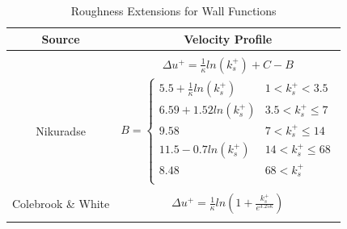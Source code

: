 \begin{table}[htb!]
\centering
\caption{Roughness Extensions for Wall Functions}
\label{tab:roughnessExtensionss}
\begin{tabular}{cc}
\hline
Source &
Velocity Profile \\ \hline\hline
& \\ 
& $\Delta u^+ = \frac{1}{\kappa}ln(k_s^+) + C - B $ \\
Nikuradse  \cite{nikuradse1933laws} & 
$B =
    \begin{cases}
      5.5 + \frac{1}{\kappa} ln(k_s^+) & 1<k_s^+ <3.5\\
      6.59 + 1.52ln(k_s^+) & 3.5<k_s^+ \leq 7\\
      9.58 & 7<k_s^+ \leq 14\\
      11.5 - 0.7ln(k_s^+) & 14<k_s^+ \leq 68\\
      8.48 & 68<k_s^+\\
    \end{cases}$ \\  
& \\ 
Colebrook \& White  \cite{colebrook1937experiments} & $ \Delta u^+ = \frac{1}{\kappa} ln(1+ \frac{k_s^+}{e^{3.25\kappa}})$\\ 
& \\ 
\hline
\end{tabular}
\end{table}